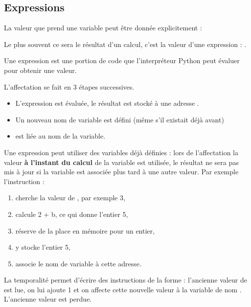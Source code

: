\subsection{Expressions}
La valeur que prend une variable peut être donnée explicitement : 

Le plus souvent ce sera le résultat d'un calcul, c'est la valeur d'une expression : .
\begin{defin}
Une  expression est une portion de code que l'interpréteur Python peut évaluer pour obtenir une valeur.
\end{defin}
L'affectation se fait en 3 étapes successives. 
\begin{itemize}
\item L'expression est évaluée, le résultat est stocké à une adresse .
\item Un nouveau nom de variable est défini (même s'il existait déjà avant)
\item {} est liée au nom de la variable.
\end{itemize}
Une expression peut utiliser des variables déjà définies : lors de l'affectation la valeur {\bf à l'instant du calcul} de la variable est utilisée, le résultat ne sera pas mis à jour si la variable est associée plus tard à une autre valeur.
Par exemple l'instruction  :
\begin{enumerate}
    \item cherche la valeur de , par exemple 3,
\item calcule 2 + b, ce qui donne l'entier 5,
\item réserve de la place en mémoire pour un entier,
\item y stocke l'entier 5,
\item associe le nom de variable  à cette adresse.
\end{enumerate}
La temporalité permet d'écrire des instructions de la forme  : l'ancienne valeur de  est lue, on lui ajoute 1 et on affecte cette nouvelle valeur à la variable de nom . L'ancienne valeur est perdue.
